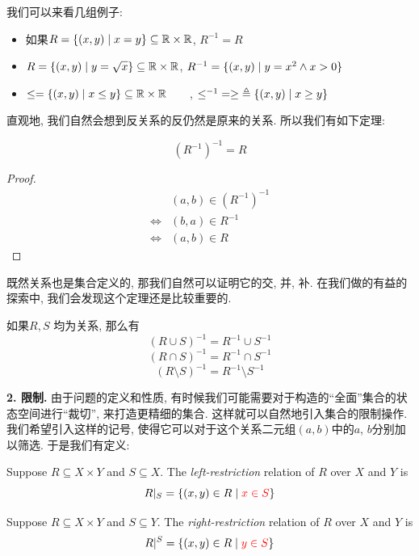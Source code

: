 我们可以来看几组例子: 
\begin{itemize}
  \item 如果$R = \{(x, y) \mid x = y\}\subseteq \mathbb{R} \times \mathbb{R}$, $R^{-1} = R$
  \item $R = \{(x, y) \mid y = \sqrt{x}\} \subseteq \mathbb{R} \times \mathbb{R}$, $R^{-1} = \{(x, y) \mid y = x^{2} \land x > 0\}$
  \item $\le = \{(x, y) \mid x \le y\} \subseteq \mathbb{R} \times \mathbb{R} \qquad$, $\le^{-1} \;= \ge \;\triangleq \{(x, y) \mid x \ge y\}$
\end{itemize}

直观地, 我们自然会想到反关系的反仍然是原来的关系. 所以我们有如下定理: 

\begin{theorem}
  \[
    (R^{-1})^{-1} = R
  \]
\end{theorem}

\begin{proof}
  \setcounter{equation}{0}
  \begin{align*}
    &(a, b) \in (R^{-1})^{-1} \\
    \iff& (b, a) \in R^{-1} \\
    \iff& (a, b) \in R
  \end{align*}
\end{proof}

既然关系也是集合定义的, 那我们自然可以证明它的交, 并, 补. 在我们做的有益的探索中, 我们会发现这个定理还是比较重要的. 

\begin{theorem}[关系的逆]
    如果$R, S$ 均为关系, 那么有
  \[
    (R \cup S)^{-1} = R^{-1} \cup S^{-1}
  \]
  \[
    (R \cap S)^{-1} = R^{-1} \cap S^{-1}
  \]
  \[
    (R \setminus S)^{-1} = R^{-1} \setminus S^{-1}
  \]
\end{theorem}

\textbf{2. 限制. } 由于问题的定义和性质, 有时候我们可能需要对于构造的``全面''集合的状态空间进行``裁切'', 来打造更精细的集合. 这样就可以自然地引入集合的限制操作. 我们希望引入这样的记号, 使得它可以对于这个关系二元组$(a,b)$中的$a$, $b$分别加以筛选. 于是我们有定义: 

\begin{definition}
  Suppose $R \subseteq X \times Y$ and $S \subseteq X$.
  The {\it left-restriction} relation of $R$  over $X$ and $Y$ is
  \[
    R|_{S} = \{(x, y) \in R \mid \textcolor{red}{x \in S}\}
  \]
\end{definition}

\begin{definition}
  Suppose $R \subseteq X \times Y$ and $S \subseteq Y$.
  The {\it right-restriction} relation of $R$  over $X$ and $Y$ is
  \[
    R|^{S} = \{(x, y) \in R \mid \textcolor{red}{y \in S}\}
  \]
\end{definition}

